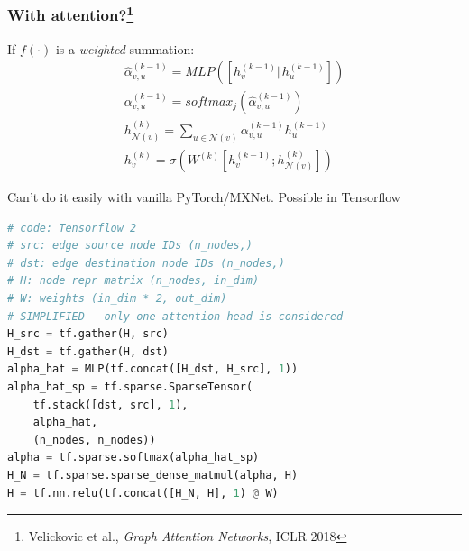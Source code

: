 \documentclass[10pt,aspectratio=169]{beamer}
\begin{document}
	\begin{frame}[fragile]
		\frametitle{With attention?\footnote{Velickovic et al., \emph{Graph Attention Networks}, ICLR 2018}}
		\begin{minipage}{0.4\textwidth}
			If $f(\cdot)$ is a \emph{weighted} summation:
			$$
			\begin{gathered}
			\hat\alpha ^{(k-1)}_{v,u} = MLP\left(\left[h_v^{(k-1)} \Vert h_u^{(k-1)}\right]\right) \\
			\alpha^{(k-1)}_{v,u} = softmax_j\left(
			\hat\alpha ^{(k-1)}_{v,u}
			\right)\\
			h_{\mathcal{N}(v)}^{(k)} =
			\sum_{u \in \mathcal{N}(v)} \alpha^{(k-1)}_{v,u} h^{(k-1)}_u \\
			h^{(k)}_v =
			\sigma \left( W^{(k)} \left[h_v^{(k-1)}; h_{\mathcal{N}(v)}^{(k)}\right] \right)
			\end{gathered}
			$$
		\end{minipage}\hfill%
		\begin{minipage}{0.5\textwidth}
			Can't do it easily with vanilla PyTorch/MXNet.  Possible in Tensorflow
\begin{lstlisting}[language=Python]
# code: Tensorflow 2
# src: edge source node IDs (n_nodes,)
# dst: edge destination node IDs (n_nodes,)
# H: node repr matrix (n_nodes, in_dim)
# W: weights (in_dim * 2, out_dim)
# SIMPLIFIED - only one attention head is considered
H_src = tf.gather(H, src)
H_dst = tf.gather(H, dst)
alpha_hat = MLP(tf.concat([H_dst, H_src], 1))
alpha_hat_sp = tf.sparse.SparseTensor(
    tf.stack([dst, src], 1),
    alpha_hat,
    (n_nodes, n_nodes))
alpha = tf.sparse.softmax(alpha_hat_sp)
H_N = tf.sparse.sparse_dense_matmul(alpha, H)
H = tf.nn.relu(tf.concat([H_N, H], 1) @ W)
\end{lstlisting}
		\end{minipage}
	\end{frame}
\end{document}
